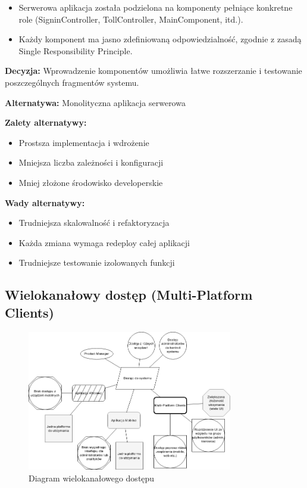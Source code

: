 \documentclass[12pt]{article}
\begin{document}
\begin{itemize}
\item Serwerowa aplikacja została podzielona na komponenty pełniące konkretne role (SigninController, TollController, MainComponent, itd.).
\item Każdy komponent ma jasno zdefiniowaną odpowiedzialność, zgodnie z zasadą Single Responsibility Principle.
\end{itemize}

\textbf{Decyzja:} Wprowadzenie komponentów umożliwia łatwe rozszerzanie i testowanie poszczególnych fragmentów systemu.

\textbf{Alternatywa:} Monolityczna aplikacja serwerowa

\textbf{Zalety alternatywy:}
\begin{itemize}
\item Prostsza implementacja i wdrożenie
\item Mniejsza liczba zależności i konfiguracji
\item Mniej złożone środowisko developerskie
\end{itemize}

\textbf{Wady alternatywy:}
\begin{itemize}
\item Trudniejsza skalowalność i refaktoryzacja
\item Każda zmiana wymaga redeploy całej aplikacji
\item Trudniejsze testowanie izolowanych funkcji
\end{itemize}

\subsection{Wielokanałowy dostęp (Multi-Platform Clients)}
\begin{figure}[H]
\centering
\includegraphics[width=0.8\textwidth]{dostep_do_systemu.png}
\caption{Diagram wielokanałowego dostępu}
\label{fig:multichannel}
\end{figure}
\end{document}
